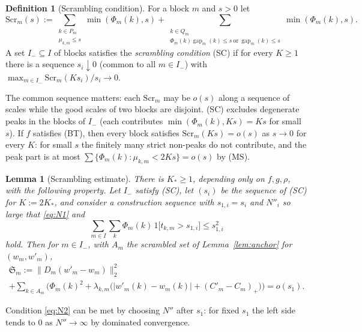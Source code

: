 \documentclass[10pt]{amsart}
\newtheorem{lemma}[theorem]{Lemma}
\theoremstyle{definition}
\newtheorem{definition}[theorem]{Definition}
\theoremstyle{remark}
\newcommand{\gap}{\operatorname{gap}}
\begin{document}
\begin{definition}[Scrambling condition]\label{def:SC}
For a block $m$ and $s>0$ let
\[
 \mathrm{Scr}_m(s):=\sum_{\substack{k\in P_m\\ \mu_{k,m}\le s}}
 \min(\Phi_m(k),s)+\sum_{\substack{k\in Q_m\\ \Phi_m(k)\gap_m(k)\le s\ \text{or}
 \ \gap_m(k)\le s}}\min(\Phi_m(k),s).
\]
A set $I_-\subseteq I$ of blocks satisfies the \emph{scrambling condition}
\textup{(SC)} if for every $K\ge1$ there is a sequence $s_i\downarrow0$
\textup{(}common to all $m\in I_-$\textup{)} with
$\max_{m\in I_-}\mathrm{Scr}_m(Ks_i)/s_i\to0$.
\end{definition}

The common sequence matters: each $\mathrm{Scr}_m$ may be $o(s)$ along a
sequence of scales while the good scales of two blocks are disjoint.
\textup{(SC)} excludes degenerate peaks in the blocks of $I_-$ (each
contributes $\min(\Phi_m(k),Ks)=Ks$ for small $s$).  If $f$ satisfies
\textup{(BT)}, then every block satisfies $\mathrm{Scr}_m(Ks)=o(s)$ as
$s\to0$ for every $K$: for small $s$ the finitely many strict non-peaks do not
contribute, and the peak part is at most
$\sum\{\Phi_m(k):\mu_{k,m}<2Ks\}=o(s)$ by \textup{(MS)}.

\begin{lemma}[Scrambling estimate]\label{lem:scrambling}
There is $K_*\ge1$, depending only on $f,g,\rho$, with the following
property.  Let $I_-$ satisfy \textup{(SC)}, let $(s_i)$ be the sequence of
\textup{(SC)} for $K:=2K_*$, and consider a construction sequence with
$s_{1,i}=s_i$ and $N''_i$ so large that \eqref{eq:N1} and
\begin{equation}\label{eq:N2}
 \sum_{m\in I}\sum_k\Phi_m(k)\,1\big[t_{k,m}>s_{1,i}\big]\le s_{1,i}^2
\end{equation}
hold.  Then for $m\in I_-$, with $A_m$ the scrambled set of
Lemma~\ref{lem:anchor} for $(w_m,w'_m)$,
\begin{multline*}
 \mathfrak S_m:=\|D_m(w'_m-w_m)\|_2^2\\
 +\sum_{k\in A_m}\Big(\Phi_m(k)^2+
 \lambda_{k,m}\big(|w'_m(k)-w_m(k)|+(C'_m-C_m)_+\big)\Big)=o(s_1).
\end{multline*}
\end{lemma}

Condition \eqref{eq:N2} can be met by choosing $N''$ after $s_1$: for fixed
$s_1$ the left side tends to $0$ as $N''\to\infty$ by dominated convergence.
\end{document}
